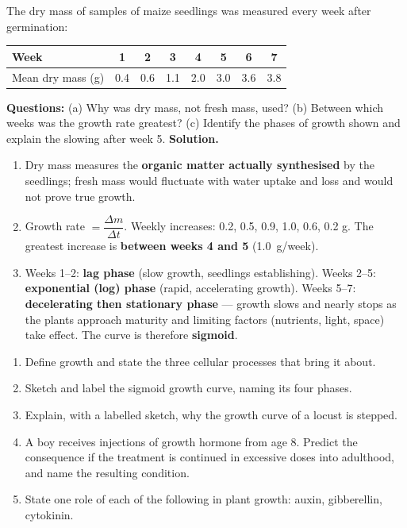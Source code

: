 \documentclass[11pt]{article}
\begin{document}
\begin{exoresolu}
The dry mass of samples of maize seedlings was measured every week after germination:

\begin{center}
\begin{tabular}{|l|ccccccc|}
\hline
\rowcolor{popblueL} Week & 1 & 2 & 3 & 4 & 5 & 6 & 7 \\
\hline
Mean dry mass (g) & 0.4 & 0.6 & 1.1 & 2.0 & 3.0 & 3.6 & 3.8 \\
\hline
\end{tabular}
\end{center}

\textbf{Questions:} (a) Why was dry mass, not fresh mass, used? (b) Between which weeks was the growth rate greatest? (c) Identify the phases of growth shown and explain the slowing after week 5.
\tcblower
\textbf{Solution.}
\begin{enumerate}
\item[(a)] Dry mass measures the \textbf{organic matter actually synthesised} by the seedlings; fresh mass would fluctuate with water uptake and loss and would not prove true growth.
\item[(b)] Growth rate $= \dfrac{\Delta m}{\Delta t}$. Weekly increases: 0.2, 0.5, 0.9, 1.0, 0.6, 0.2 g. The greatest increase is \textbf{between weeks 4 and 5} (\SI{1.0}{g/week}).
\item[(c)] Weeks 1--2: \textbf{lag phase} (slow growth, seedlings establishing). Weeks 2--5: \textbf{exponential (log) phase} (rapid, accelerating growth). Weeks 5--7: \textbf{decelerating then stationary phase} --- growth slows and nearly stops as the plants approach maturity and limiting factors (nutrients, light, space) take effect. The curve is therefore \textbf{sigmoid}.
\end{enumerate}
\end{exoresolu}

\begin{exercice}
\begin{enumerate}
\item Define growth and state the three cellular processes that bring it about.
\item Sketch and label the sigmoid growth curve, naming its four phases.
\item Explain, with a labelled sketch, why the growth curve of a locust is stepped.
\item A boy receives injections of growth hormone from age 8. Predict the consequence if the treatment is continued in excessive doses into adulthood, and name the resulting condition.
\item State one role of each of the following in plant growth: auxin, gibberellin, cytokinin.
\end{enumerate}
\end{exercice}
\end{document}
